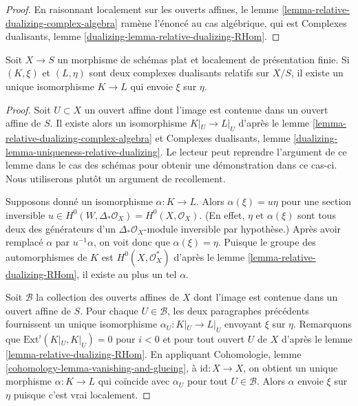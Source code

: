 \begin{proof}
En raisonnant localement sur les ouverts affines, le lemme \ref{lemma-relative-dualizing-complex-algebra} ramène l'énoncé au cas algébrique, qui est Complexes dualisants, lemme \ref{dualizing-lemma-relative-dualizing-RHom}.
\end{proof}

\begin{lemma}
\label{lemma-uniqueness-relative-dualizing}
Soit $X \to S$ un morphisme de schémas plat et localement de présentation finie. Si $(K, \xi)$ et $(L, \eta)$ sont deux complexes dualisants relatifs sur $X/S$, il existe un unique isomorphisme $K \to L$ qui envoie $\xi$ sur $\eta$.
\end{lemma}

\begin{proof}
Soit $U \subset X$ un ouvert affine dont l'image est contenue dans un ouvert affine de $S$. Il existe alors un isomorphisme $K|_U \to L|_U$ d'après le lemme \ref{lemma-relative-dualizing-complex-algebra} et Complexes dualisants, lemme \ref{dualizing-lemma-uniqueness-relative-dualizing}. Le lecteur peut reprendre l'argument de ce lemme dans le cas des schémas pour obtenir une démonstration dans ce cas-ci. Nous utiliserons plutôt un argument de recollement.

\medskip\noindent
Supposons donné un isomorphisme $\alpha : K \to L$. Alors $\alpha(\xi) = u \eta$ pour une section inversible $u \in H^0(W, \Delta_*\mathcal{O}_X) = H^0(X, \mathcal{O}_X)$. (En effet, $\eta$ et $\alpha(\xi)$ sont tous deux des générateurs d'un $\Delta_*\mathcal{O}_X$-module inversible par hypothèse.) Après avoir remplacé $\alpha$ par $u^{-1}\alpha$, on voit donc que $\alpha(\xi) = \eta$. Puisque le groupe des automorphismes de $K$ est $H^0(X, \mathcal{O}_X^*)$ d'après le lemme \ref{lemma-relative-dualizing-RHom}, il existe au plus un tel $\alpha$.

\medskip\noindent
Soit $\mathcal{B}$ la collection des ouverts affines de $X$ dont l'image est contenue dans un ouvert affine de $S$. Pour chaque $U \in \mathcal{B}$, les deux paragraphes précédents fournissent un unique isomorphisme $\alpha_U : K|_U \to L|_U$ envoyant $\xi$ sur $\eta$. Remarquons que $\text{Ext}^i(K|_U, K|_U) = 0$ pour $i < 0$ et pour tout ouvert $U$ de $X$ d'après le lemme \ref{lemma-relative-dualizing-RHom}. En appliquant Cohomologie, lemme \ref{cohomology-lemma-vanishing-and-glueing}, à $\text{id} : X \to X$, on obtient un unique morphisme $\alpha : K \to L$ qui coïncide avec $\alpha_U$ pour tout $U \in \mathcal{B}$. Alors $\alpha$ envoie $\xi$ sur $\eta$ puisque c'est vrai localement.
\end{proof}

